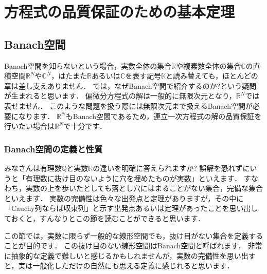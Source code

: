 \chapter{方程式の品質保証のための基本定理}\label{chap:basic_theorem}

%
\section{Banach空間}\label{sec:Banach_space}
Banach空間を知らないという場合，実数全体の集合${\mathbb R}$や複素数全体の集合${\mathbb C}$の直積空間${\mathbb R}^{N}$や${\mathbb C}^N$，はたまた${\mathbb R}$あるいは${\mathbb C}$を表す記号${\mathbb K}$と読み替えても，ほとんどの章は差し支えありません．
では，なぜBanach空間で紹介するのか?という疑問が生まれると思います．
偏微分方程式の解は一般的に無限次元となり，${\mathbb R}^{N}$では表せません．
このような問題を扱う際には無限次元まで扱えるBanach空間が必要になります．
${\mathbb R}^{N}$もBanach空間であるため，連立一次方程式の解の品質保証を行いたい場合は${\mathbb R}^{N}$で十分です．

\subsection{Banach空間の定義と性質}\label{sec:define_Banach}
みなさんは有理数${\mathbb Q}$と実数${\mathbb R}$の違いを明確に答えられますか?
誤解を恐れずにいうと「有理数に抜け目のないように穴を埋めたものが実数」といえます．
すなわち，実数の上を歩いたとしても落とし穴にはまることがない集合，完備な集合といえます．
実数の完備性は色々な出発点と定理がありますが，その中に「Cauchy列ならば収束列」と示す出発点あるいは定理があったことを思い出しておくと，すんなりとこの節を読むことができると思います．


この節では，実数に限らず一般的な線形空間でも，抜け目がない集合を定義することが目的です．
この抜け目のない線形空間はBanach空間と呼ばれます．
非常に抽象的な定義で難しいと感じるかもしれませんが，実数の完備性を思い出すと，実は一般化しただけの自然にも思える定義に感じれると思います．

